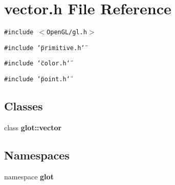 \section{vector.h File Reference}
\label{vector_8h}
{\tt \#include $<$OpenGL/gl.h$>$}\par
{\tt \#include \char`\"{}primitive.h\char`\"{}}\par
{\tt \#include \char`\"{}color.h\char`\"{}}\par
{\tt \#include \char`\"{}point.h\char`\"{}}\par
\subsection*{Classes}
\begin{CompactItemize}
\item 
class {\bf glot::vector}
\end{CompactItemize}
\subsection*{Namespaces}
\begin{CompactItemize}
\item 
namespace {\bf glot}
\end{CompactItemize}
